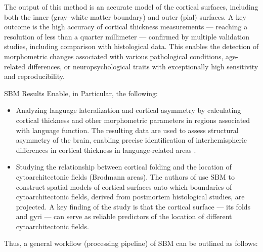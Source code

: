 \documentclass[default]{subfiles}
\begin{document}
The output of this method is an accurate model of the cortical surfaces, including both the inner (gray–white matter
boundary) and outer (pial) surfaces. A key outcome is the high accuracy of cortical thickness measurements — reaching a
resolution of less than a quarter millimeter — confirmed by multiple validation studies, including comparison with
histological data. This enables the detection of morphometric changes associated with various pathological conditions,
age-related differences, or neuropsychological traits with exceptionally high sensitivity and reproducibility.

SBM Results Enable, in Particular, the following:
\begin{itemize}
    \item Analyzing language lateralization and cortical asymmetry by calculating cortical thickness and other
    morphometric parameters in regions associated with language function. The resulting data are used to assess
    structural asymmetry of the brain, enabling precise identification of interhemispheric differences in cortical
    thickness in language-related areas \cite{greve_2013}.
    
    \item Studying the relationship between cortical folding and the location of cytoarchitectonic fields
    (Brodmann areas). The authors of \cite{fischl_2008} use SBM to construct spatial models of cortical surfaces onto
    which boundaries of cytoarchitectonic fields, derived from postmortem histological studies, are projected. A key
    finding of the study is that the cortical surface — its folds and gyri — can serve as reliable predictors of the
    location of different cytoarchitectonic fields.
\end{itemize}

Thus, a general workflow (processing pipeline) of SBM can be outlined as follows:\newline
\end{document}
